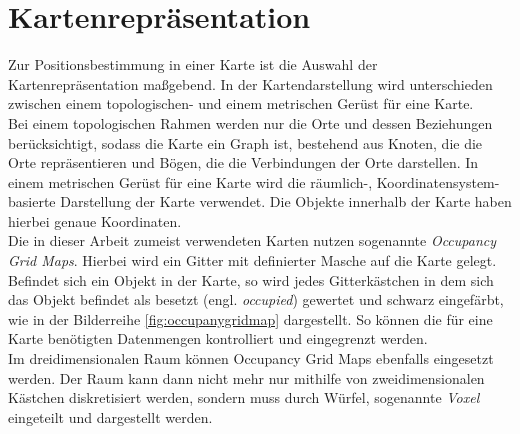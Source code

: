 \section{Kartenrepräsentation}\label{sec:Kartenrepräsentation}
Zur Positionsbestimmung in einer Karte ist die Auswahl der Kartenrepräsentation maßgebend. In der Kartendarstellung wird unterschieden zwischen einem topologischen- und einem metrischen Gerüst für eine Karte.\\
Bei einem topologischen Rahmen werden nur die Orte und dessen Beziehungen berücksichtigt, sodass die Karte ein Graph ist, bestehend aus Knoten, die die Orte repräsentieren und Bögen, die die Verbindungen der Orte darstellen. In einem metrischen Gerüst für eine Karte wird die räumlich-, Koordinatensystem-basierte Darstellung der Karte verwendet. Die Objekte innerhalb der Karte haben hierbei genaue Koordinaten.\\
Die in dieser Arbeit zumeist verwendeten Karten nutzen sogenannte \textit{Occupancy Grid Maps}. Hierbei wird ein Gitter mit definierter Masche auf die Karte gelegt. Befindet sich ein Objekt in der Karte, so wird jedes Gitterkästchen in dem sich das Objekt befindet als besetzt (engl. \textit{occupied}) gewertet und schwarz eingefärbt, wie in der Bilderreihe \ref{fig:occupanygridmap} dargestellt. So können die für eine Karte benötigten Datenmengen kontrolliert und eingegrenzt werden.\\
Im dreidimensionalen Raum können Occupancy Grid Maps ebenfalls eingesetzt werden. Der Raum kann dann nicht mehr nur mithilfe von zweidimensionalen Kästchen diskretisiert werden, sondern muss durch Würfel, sogenannte \textit{Voxel} eingeteilt und dargestellt werden.
\mbox{} %
